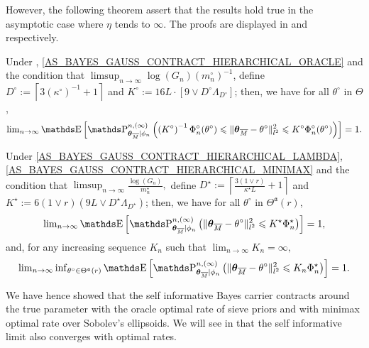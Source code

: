 However, the following theorem assert that the results hold true in the asymptotic case where $\eta$ tends to $\infty$.
The proofs are displayed in  and  respectively.

\begin{thm}\label{THM_BAYES_IGSSM_KNOWN_IID_ORACLE_NP}
Under , \textsc{\cref{AS_BAYES_GAUSS_CONTRACT_HIERARCHICAL_ORACLE}} and the condition that $\limsup\nolimits_{n \rightarrow \infty} \log\left(G_{n}\right) (m_{n}^{\circ})^{-1}$, define $D^{\circ} := \left\lceil 3 (\kappa^{\circ})^{-1} + 1 \right\rceil$ and $K^{\circ} := 16 L \cdot \left[9 \vee D^{\circ} \Lambda_{D^{\circ}}\right]$; then, we have for all $\theta^{\circ}$ in $\Theta$,
\[\lim\nolimits_{n \rightarrow \infty} \E\left[\P_{\boldsymbol{\theta}_{\overline{M}} \vert \phi_{n}}^{n, (\infty)}\left(\left(K^{\circ}\right)^{-1} \Phi_{n}^{\circ}(\theta^{\circ}) \leq \Vert \boldsymbol{\theta}_{\overline{M}} - \theta^{\circ} \Vert_{l^{2}}^{2} \leq K^{\circ} \Phi_{n}^{\circ}(\theta^{\circ}) \right)\right] = 1.\]
\end{thm}

\begin{thm}\label{THM_BAYES_IGSSM_KNOWN_IID_MINIMAX_NP}
Under \textsc{\cref{AS_BAYES_GAUSS_CONTRACT_HIERARCHICAL_LAMBDA}}, \textsc{\cref{AS_BAYES_GAUSS_CONTRACT_HIERARCHICAL_MINIMAX}} and the condition that $\limsup\nolimits_{n \rightarrow \infty} \frac{\log\left(G_{n}\right)}{m_{n}^{\star}},$ define $D^{\star} := \left\lceil \frac{3 \left(1 \vee r\right)}{\kappa^{\star} L} + 1 \right\rceil$ and $K^{\star} := 6 (1 \vee r) (9L \vee D^{\star} \Lambda_{D^{\star}})$; then, we have for all $\theta^{\circ}$ in $\Theta^{\mathfrak{a}}(r)$,
\[\lim\nolimits_{n \rightarrow \infty} \E\left[\P_{\boldsymbol{\theta}_{\overline{M}} \vert \phi_{n}}^{n, (\infty)}\left(\Vert \boldsymbol{\theta}_{\overline{M}} - \theta^{\circ} \Vert_{l^{2}}^{2} \leq K^{\star} \Phi_{n}^{\star} \right)\right] = 1,\]
and, for any increasing sequence $K_{n}$ such that $\lim\nolimits_{n \rightarrow \infty} K_{n} = \infty,$
\[\lim\nolimits_{n \rightarrow \infty} \inf\nolimits_{\theta^{\circ} \in \Theta^{\mathfrak{a}}(r)} \E\left[\P_{\boldsymbol{\theta}_{\overline{M}} \vert \phi_{n}}^{n, (\infty)}\left(\Vert \boldsymbol{\theta}_{\overline{M}} - \theta^{\circ} \Vert_{l^{2}}^{2} \leq K_{n} \Phi_{n}^{\star} \right)\right] = 1.\]
\end{thm}


We have hence showed that the self informative Bayes carrier contracts around the true parameter with the oracle optimal rate of sieve priors and with minimax optimal rate over Sobolev's ellipsoids.
We will see in  that the self informative limit also converges with optimal rates.